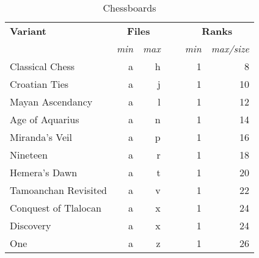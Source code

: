 \begin{table}[!h]
\centering
\begin{tabular}{ lrrcrr }
\toprule %
\textbf{Variant}      & \multicolumn{2}{c}{ \textbf{Files} } & ~ & \multicolumn{2}{c}{ \textbf{Ranks} }   \\
                      \cmidrule{2-3}                             \cmidrule{5-6} %
                      & \emph{min} & \emph{max}              &   & \emph{min} & \emph{max/size}           \\
\midrule %
Classical Chess       & a          & h                       &   & 1          &  8                        \\
Croatian Ties         & a          & j                       &   & 1          & 10                        \\
Mayan Ascendancy      & a          & l                       &   & 1          & 12                        \\
Age of Aquarius       & a          & n                       &   & 1          & 14                        \\
Miranda's Veil        & a          & p                       &   & 1          & 16                        \\
Nineteen              & a          & r                       &   & 1          & 18                        \\
Hemera's Dawn         & a          & t                       &   & 1          & 20                        \\
Tamoanchan Revisited  & a          & v                       &   & 1          & 22                        \\
Conquest of Tlalocan  & a          & x                       &   & 1          & 24                        \\
Discovery             & a          & x                       &   & 1          & 24                        \\
One                   & a          & z                       &   & 1          & 26                        \\
\bottomrule %
\end{tabular}
\caption{Chessboards}
\label{tbl:Appendix/Introduction/Chessboards}
\end{table}

